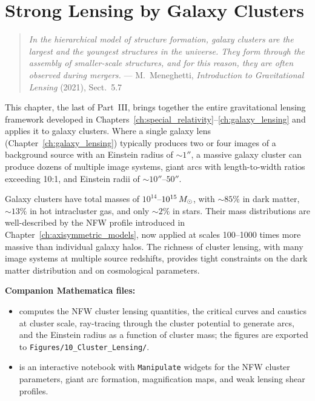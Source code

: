 
\chapter{Strong Lensing by Galaxy Clusters}
\label{ch:cluster_lensing}

\begin{quote}
\textit{In the hierarchical model of structure formation, galaxy clusters are the
largest and the youngest structures in the universe.  They form through the
assembly of smaller-scale structures, and for this reason, they are often
observed during mergers.}
\hfill --- M.~Meneghetti, \textit{Introduction to Gravitational Lensing} (2021), Sect.~5.7
\end{quote}

\noindent
This chapter, the last of Part~III, brings together the entire gravitational lensing
framework developed in Chapters~\ref{ch:special_relativity}--\ref{ch:galaxy_lensing} and applies it to
galaxy clusters.  Where a single galaxy
lens (Chapter~\ref{ch:galaxy_lensing}) typically produces two or four images of a background
source with an Einstein radius of $\sim 1''$, a massive galaxy cluster
can produce dozens of multiple image systems, giant arcs with
length-to-width ratios exceeding 10:1, and Einstein radii of
$\sim 10''$--$50''$.

Galaxy clusters have total masses of $10^{14}$--$10^{15}\,M_{\odot}$,
with $\sim 85\%$ in dark matter, $\sim 13\%$ in hot intracluster gas,
and only $\sim 2\%$ in stars.  Their mass distributions are
well-described by the NFW profile introduced in
Chapter~\ref{ch:axisymmetric_models}, now applied at scales 100--1000
times more massive than individual galaxy halos.  The richness of
cluster lensing, with many image systems at multiple source redshifts,
provides tight constraints on the dark matter distribution and on
cosmological parameters.

\medskip
\noindent
\textbf{Companion Mathematica files:}
\begin{itemize}[nosep]
    \item {}
          computes the NFW cluster lensing quantities, the critical
          curves and caustics at cluster scale, ray-tracing through
          the cluster potential to generate arcs, and the Einstein
          radius as a function of cluster mass; the figures are
          exported to \texttt{Figures/10\_Cluster\_Lensing/}.
    \item {}
          is an interactive notebook with \texttt{Manipulate} widgets
          for the NFW cluster parameters, giant arc formation,
          magnification maps, and weak lensing shear profiles.
\end{itemize}


